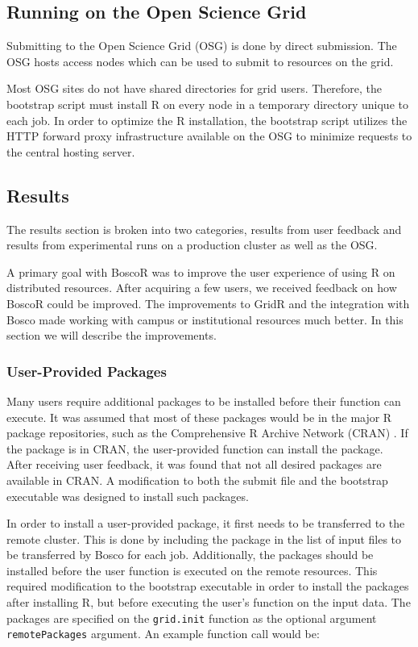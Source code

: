 \subsection{Running on the Open Science Grid}

Submitting to the Open Science Grid (OSG) is done by direct submission.  The OSG hosts access nodes which can be used to submit to resources on the grid.

Most OSG sites do not have shared directories for grid users.  Therefore, the bootstrap script must install R on every node in a temporary directory unique to each job.  In order to optimize the R installation, the bootstrap script utilizes the HTTP forward proxy infrastructure \cite{garzoglio2012supporting} available on the OSG to minimize requests to the central hosting server.


\subsection{Results}
\label{sec:boscorresults}

The results section is broken into two categories, results from user feedback and results from experimental runs on a production cluster as well as the OSG.

A primary goal with BoscoR was to improve the user experience of using R on distributed resources. After acquiring a few users, we received feedback on how BoscoR could be improved.  The improvements to GridR and the integration with Bosco made working with campus or institutional resources much better.  In this section we will describe the improvements.

\subsubsection{User-Provided Packages}

Many users require additional packages to be installed before their function can execute.  It was assumed that most of these packages would be in the major R package repositories, such as the Comprehensive R Archive Network (CRAN) \cite{cran}.  If the package is in CRAN, the user-provided function can install the package.  After receiving user feedback, it was found that not all desired packages are available in CRAN.  A modification to both the submit file and the bootstrap executable was designed to install such packages.

In order to install a user-provided package, it first needs to be transferred to the remote cluster.  This is done by including the package in the list of input files to be transferred by Bosco for each job.  Additionally, the packages should be installed before the user function is executed on the remote resources.  This required modification to the bootstrap executable in order to install the packages after installing R, but before executing the user's function on the input data.  The packages are specified on the \texttt{grid.init} function as the optional argument \texttt{remotePackages} argument.  An example function call would be:

